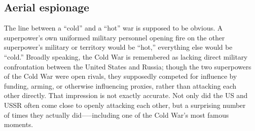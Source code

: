 \documentclass[14pt]{extarticle}
\begin{document}


\subsection{Aerial espionage}
The line between a \enquote{cold} and a \enquote{hot} war is supposed to be obvious. A superpower's own uniformed military personnel opening fire on the other superpower's military or territory would be \enquote{hot,} everything else would be \enquote{cold.} Broadly speaking, the Cold War is remembered as lacking direct military confrontation between the United States and Russia; though the two superpowers of the Cold War were open rivals, they supposedly competed for influence by funding, arming, or otherwise influencing proxies, rather than attacking each other directly. That impression is not exactly accurate. Not only did the US and USSR often come close to openly attacking each other, but a surprising number of times they actually did—--including one of the Cold War's most famous moments.

\end{document}
